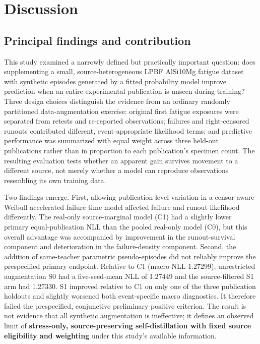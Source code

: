 \documentclass[12pt,a4paper]{article}
\begin{document}
\section{Discussion}

\subsection{Principal findings and contribution}

This study examined a narrowly defined but practically important question: does supplementing a small, source-heterogeneous LPBF AlSi10Mg fatigue dataset with synthetic episodes generated by a fitted probability model improve prediction when an entire experimental publication is unseen during training? Three design choices distinguish the evidence from an ordinary randomly partitioned data-augmentation exercise: original first fatigue exposures were separated from retests and re-reported observations; failures and right-censored runouts contributed different, event-appropriate likelihood terms; and predictive performance was summarized with equal weight across three held-out publications rather than in proportion to each publication's specimen count. The resulting evaluation tests whether an apparent gain survives movement to a different source, not merely whether a model can reproduce observations resembling its own training data.

Two findings emerge. First, allowing publication-level variation in a censor-aware Weibull accelerated failure time model affected failure and runout likelihood differently. The real-only source-marginal model (C1) had a slightly lower primary equal-publication NLL than the pooled real-only model (C0), but this overall advantage was accompanied by improvement in the runout-survival component and deterioration in the failure-density component. Second, the addition of same-teacher parametric pseudo-episodes did not reliably improve the prespecified primary endpoint. Relative to C1 (macro NLL 1.27299), unrestricted augmentation S0 had a five-seed-mean NLL of 1.27449 and the source-filtered S1 arm had 1.27330. S1 improved relative to C1 on only one of the three publication holdouts and slightly worsened both event-specific macro diagnostics. It therefore failed the prespecified, conjunctive preliminary-positive criterion. The result is not evidence that all synthetic augmentation is ineffective; it defines an observed limit of \textbf{stress-only, source-preserving self-distillation with fixed source eligibility and weighting} under this study's available information.
\end{document}
